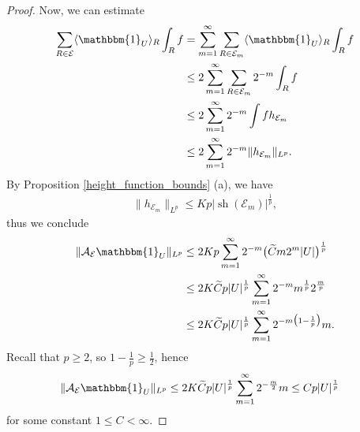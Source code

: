 \documentclass[10pt,a4paper]{amsart}
\newcommand{\ind}{\mathbbm{1}}
\newcommand{\sh}{\operatorname{sh}}
\begin{document}
\begin{proof}
  Now, we can estimate
  \begin{align*}
    \sum_{R \in \mathcal{E}} \langle \ind_U \rangle_R \int_R f
    &= \sum_{m=1}^\infty \sum_{R \in \mathcal{E}_m}
      \langle \ind_U \rangle_R \int_R f \\
    &\leq 2\sum_{m=1}^\infty \sum_{R \in \mathcal{E}_m} 2^{-m} \int_R f \\
    &\leq 2 \sum_{m=1}^\infty 2^{-m} \int f h_{\mathcal{E}_m} \\
    &\leq 2 \sum_{m=1}^\infty 2^{-m} \|h_{\mathcal{E}_m}\|_{L^p}.
  \end{align*}
  By Proposition \ref{height_function_bounds} (a), we have
  \begin{align*}
    \|h_{\mathcal{E}_m}\|_{L^p} \leq K p|\sh(\mathcal{E}_m)|^{\frac{1}{p}},
  \end{align*}
  thus we conclude
  \begin{align*}
    \|\mathcal{A}_{\mathcal{E}} \ind_U\|_{L^p} &\leq 2 K p \sum_{m=1}^\infty
    2^{-m} \big( \widetilde{C} m2^m|U| \big)^{\frac{1}{p}} \\
    &\leq 2 K \widetilde{C} p |U|^{\frac{1}{p}}
      \sum_{m=1}^\infty 2^{-m} m^{\frac{1}{p}} 2^{\frac{m}{p}} \\
    &\leq 2 K \widetilde{C} p |U|^{\frac{1}{p}}
      \sum_{m=1}^\infty 2^{-m\big(1-\frac{1}{p}\big)} m.
  \end{align*}
  Recall that $p \geq 2$, so $1 - \frac{1}{p} \geq \frac{1}{2}$, hence
  \begin{align*}
    \|\mathcal{A}_{\mathcal{E}} \ind_U\|_{L^p}
    &\leq 2 K \widetilde{C} p |U|^{\frac{1}{p}}
    \sum_{m=1}^\infty 2^{-\frac{m}{2}} m
    \leq C p|U|^{\frac{1}{p}}
  \end{align*}
  for some constant $1 \leq C < \infty$.
\end{proof}
\end{document}
